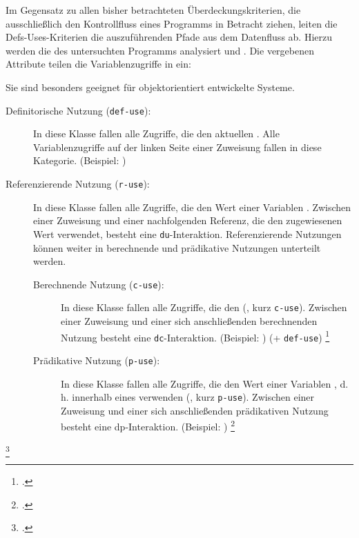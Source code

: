 \documentclass{bschlangaul-theorie}
\begin{document}
\begin{liQuellen}
\item \cite[Kapitel 8.6.3 „Methoden zur Testfallermittlung“, Seite 250-251]{schneider}
\item \cite[Kapitel 4.4.7 Def-Uses-Überdeckung, Seite 220-227]{hoffmann:software}

\end{liQuellen}
Im Gegensatz zu allen bisher betrachteten Überdeckungskriterien, die
ausschließlich den Kontrollfluss eines Programms in Betracht ziehen,
leiten die Defs-Uses-Kriterien die auszuführenden Pfade aus dem
Datenfluss ab. Hierzu werden die  des
untersuchten Programms analysiert und . Die vergebenen Attribute teilen die
Variablenzugriffe in  ein:

Sie sind besonders geeignet für objektorientiert entwickelte Systeme.

\def\TmpBeispiel#1{(Beispiel: \liJavaCode{#1})}

\begin{description}
\item[Definitorische Nutzung (\texttt{def-use}):]

In diese Klasse fallen alle Zugriffe, die den aktuellen . Alle Variablenzugriffe auf der linken
Seite einer Zuweisung fallen in diese Kategorie. \TmpBeispiel{x = 42;}

\item[Referenzierende Nutzung (\texttt{r-use}):]

In diese Klasse fallen alle Zugriffe, die den Wert einer Variablen
. Zwischen einer Zuweisung und
einer nachfolgenden Referenz, die den zugewiesenen Wert verwendet,
besteht eine \texttt{du}-Interaktion. Referenzierende Nutzungen können
weiter in berechnende und prädikative Nutzungen unterteilt werden.

\begin{description}
\item[Berechnende Nutzung (\texttt{c-use}):]

In diese Klasse fallen alle Zugriffe, die den  (,
kurz \texttt{c-use}). Zwischen einer Zuweisung und einer sich
anschließenden berechnenden Nutzung besteht eine
\texttt{dc}-Interaktion. \TmpBeispiel{x = x * 2;} (+ \texttt{def-use})
\footcite[Seite 220]{hoffmann:software}

\item[Prädikative Nutzung (\texttt{p-use}):]

In diese Klasse fallen alle Zugriffe, die den Wert einer Variablen
, d. h. innerhalb eines 
verwenden (, kurz \texttt{p-use}). Zwischen einer
Zuweisung und einer sich anschließenden prädikativen Nutzung besteht
eine dp-Interaktion. \TmpBeispiel{if (x > 42)}
\footcite[Seite 221]{hoffmann:software}
\end{description}
\end{description}
\footcite[Seite 42]{sosy:fs:5}
\end{document}

